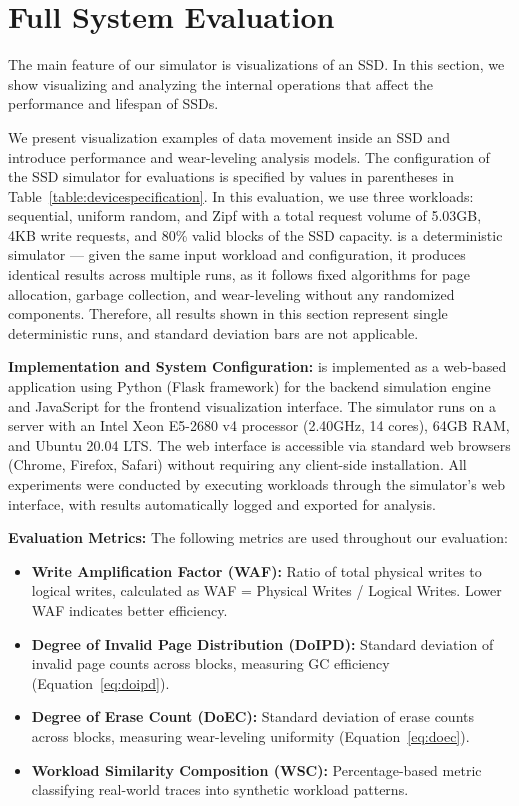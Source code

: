 \documentclass{ieeeaccess}
\begin{document}
\section{Full System Evaluation}
\label{full_system_evaluation}
The main feature of our simulator is visualizations of an SSD.
In this section, we show visualizing and analyzing the internal operations that affect the performance and lifespan of SSDs.

We present visualization examples of data movement inside an SSD and introduce performance and wear-leveling analysis models.
The configuration of the SSD simulator for evaluations is specified by values in parentheses in Table~\ref{table:devicespecification}.
In this evaluation, we use three workloads: sequential, uniform random, and Zipf with a total request volume of 5.03GB, 4KB write requests, and 80\% valid blocks of the SSD capacity. \eyanassdsim is a deterministic simulator --- given the same input workload and configuration, it produces identical results across multiple runs, as it follows fixed algorithms for page allocation, garbage collection, and wear-leveling without any randomized components. Therefore, all results shown in this section represent single deterministic runs, and standard deviation bars are not applicable.

\textbf{Implementation and System Configuration:} \eyanassdsim is implemented as a web-based application using Python (Flask framework) for the backend simulation engine and JavaScript for the frontend visualization interface. The simulator runs on a server with an Intel Xeon E5-2680 v4 processor (2.40GHz, 14 cores), 64GB RAM, and Ubuntu 20.04 LTS. The web interface is accessible via standard web browsers (Chrome, Firefox, Safari) without requiring any client-side installation. All experiments were conducted by executing workloads through the simulator's web interface, with results automatically logged and exported for analysis.

\textbf{Evaluation Metrics:} The following metrics are used throughout our evaluation:
\begin{itemize}
 \item \textbf{Write Amplification Factor (WAF):} Ratio of total physical writes to logical writes, calculated as WAF = Physical Writes / Logical Writes. Lower WAF indicates better efficiency.
 \item \textbf{Degree of Invalid Page Distribution (DoIPD):} Standard deviation of invalid page counts across blocks, measuring GC efficiency (Equation~\ref{eq:doipd}).
 \item \textbf{Degree of Erase Count (DoEC):} Standard deviation of erase counts across blocks, measuring wear-leveling uniformity (Equation~\ref{eq:doec}).
 \item \textbf{Workload Similarity Composition (WSC):} Percentage-based metric classifying real-world traces into synthetic workload patterns.
\end{itemize}
\end{document}

